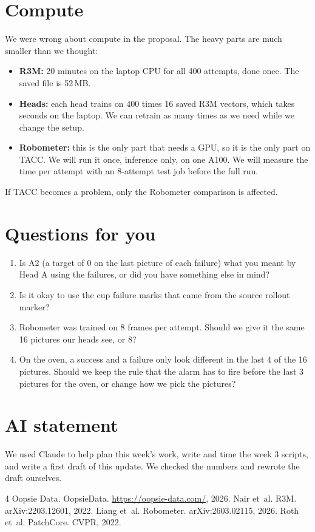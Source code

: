 \documentclass{article}
\begin{document}
\section{Compute}\label{sec:compute}
We were wrong about compute in the proposal. The heavy parts are much smaller than we thought:
\begin{itemize}
\item \textbf{R3M:} 20 minutes on the laptop CPU for all 400 attempts, done once. The saved file is 52\,MB.
\item \textbf{Heads:} each head trains on 400 times 16 saved R3M vectors, which takes seconds on the laptop. We can retrain as many times as we need while we change the setup.
\item \textbf{Robometer:} this is the only part that needs a GPU, so it is the only part on TACC. We will run it once, inference only, on one A100. We will measure the time per attempt with an 8-attempt test job before the full run.
\end{itemize}
If TACC becomes a problem, only the Robometer comparison is affected.

\section{Questions for you}\label{sec:questions}
\begin{enumerate}
\item Is A2 (a target of 0 on the last picture of each failure) what you meant by Head A using the failures, or did you have something else in mind?
\item Is it okay to use the cup failure marks that came from the source rollout marker?
\item Robometer was trained on 8 frames per attempt. Should we give it the same 16 pictures our heads see, or 8?
\item On the oven, a success and a failure only look different in the last 4 of the 16 pictures. Should we keep the rule that the alarm has to fire before the last 3 pictures for the oven, or change how we pick the pictures?
\end{enumerate}

\section{AI statement}
We used Claude to help plan this week's work, write and time the week 3 scripts, and write a first draft of this update. We checked the numbers and rewrote the draft ourselves.

\begingroup
\scriptsize
\raggedright
\setlength{\parskip}{0pt}
\setlength{\itemsep}{0pt}
\setlength{\parsep}{0pt}
\setlength{\bibsep}{0pt}
\begin{thebibliography}{4}
 Oopsie Data. OopsieData. \url{https://oopsie-data.com/}, 2026.
 Nair et~al. R3M. arXiv:2203.12601, 2022.
 Liang et~al. Robometer. arXiv:2603.02115, 2026.
 Roth et~al. PatchCore. CVPR, 2022.
\end{thebibliography}
\endgroup
\end{document}
